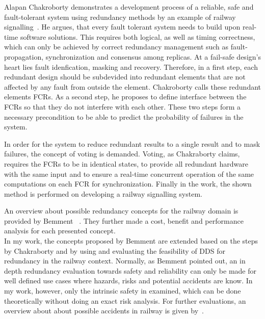 Alapan Chakroborty demonstrates a development process of a reliable, safe and fault-tolerant system using redundancy methods by an example of railway signalling~\cite{ChakrabortyFaultTolerantRailway}.
He argues, that every fault tolerant system needs to build upon real-time software solutions.
This requires both logical, as well as timing correctness, which can only be achieved by correct redundancy management such as fault-propagation, synchronization and consensus among replicas.
At a fail-safe design's heart lies fault idenfication, masking and recovery.
Therefore, in a first step, each redundant design should be subdevided into redundant elements that are not affected by any fault from outside the element.
Chakroborty calls these redundant elements \glspl*{FCR}.
As a second step, he proposes to define interface between the \glspl*{FCR} so that they do not interfere with each other.
These two steps form a necessary precondition to be able to predict the probability of failures in the system.

In order for the system to reduce redundant results to a single result and to mask failures, the concept of voting is demanded.
Voting, as Chakraborty claims, requires the \glspl*{FCR} to be in identical states, to provide all redundant hardware with the same input and to ensure a real-time concurrent operation of the same computations on each \gls*{FCR} for synchronization.
Finally in the work, the shown method is performed on developing a railway signalling system.

An overview about possible redundancy concepts for the railway domain is provided by Bemment \etal~\cite{BemmentEvaluationOfRedundancy}.
They further made a cost, benefit and performance analysis for each presented concept.
\\

In my work, the concepts proposed by Bemment \etal are extended based on the steps by Chakraborty and by using and evaluating the feasibility of \gls*{DDS} for redundancy in the railway context.
Normally, as Bemment \etal pointed out, an in depth redundancy evaluation towards safety and reliability can only be made for well defined use cases where hazards, risks and potential accidents are know.
In my work, however, only the intrinsic safety in examined, which can be done theoretically without doing an exact risk analysis.
For further evaluations, an overview about about possible accidents in railway is given by~\cite{ERTMSRailwayAccidents}.
\\

